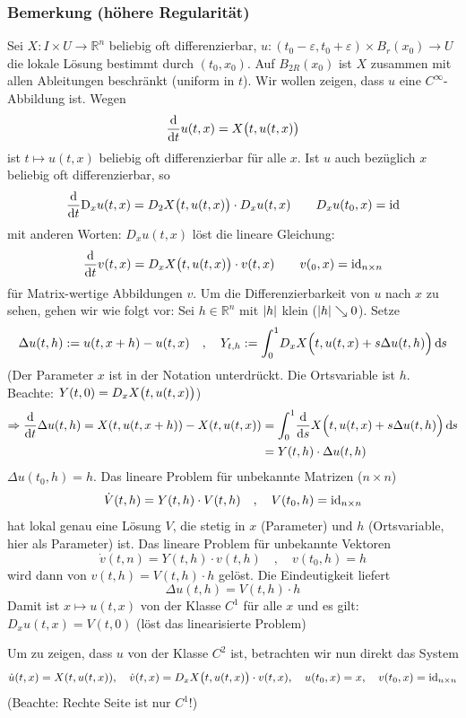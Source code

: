 \subsubsection{Bemerkung (höhere Regularität)} %
\label{ssub:233}
Sei $X : I  \times U \to \mathds{R}^n$ beliebig oft differenzierbar, $u : (t_0 - \varepsilon, t_0 + \varepsilon)  \times B_r(x_0) \to U$ die lokale Lösung bestimmt durch
$(t_0, x_0)$. Auf $B_{2R}(x_0)$ ist $X$ zusammen mit allen Ableitungen beschränkt (uniform in $t$). Wir wollen zeigen, dass $u$ eine $C^\infty$-Abbildung ist. Wegen 
\[
	\diffd{}{t} u(t,x) = X \enbrace[\big]{t, u(t,x)} 
\]
ist $t \mapsto u(t,x)$ beliebig oft differenzierbar für alle $x$. Ist $u$ auch bezüglich $x$ beliebig oft differenzierbar, so 
\[
	\diffd{}{t} \mathrm{D}_x u(t,x) = D_2 X \enbrace[\big]{t, u(t,x)}  \cdot D_x u(t,x) \qquad D_x u(t_0,x) = \id
\]
mit anderen Worten: $D_x u(t,x)$ löst die lineare Gleichung:
\[
	\diffd{}{t} v(t,x) = D_x X\enbrace[\big]{t, u(t,x) } \cdot v(t,x) \qquad v(_0, x) = \id_{n \times n}
\] 
für Matrix-wertige Abbildungen $v$. Um die Differenzierbarkeit von $u$ nach $x$ zu sehen, gehen wir wie folgt vor: Sei $h \in \mathds{R}^n$ mit $\abs*{h}$ klein
($\abs*{h} \searrow 0$). Setze
\[
	\Delta u(t,h) := u(t, x+h) - u(t,x) \quad , \quad Y_{t,h} := \int_0^1 \! D_x X\enbrace[\Big]{t, u(t,x) + s \Delta u(t,h)}  \, \mathd s
\]
(Der Parameter $x$ ist in der Notation unterdrückt. Die Ortsvariable ist $h$. Beachte: $Y(t,0) = D_x X \enbrace[\big]{t, u(t,x)} $)
\begin{align*}
	\Rightarrow  \diffd{}{t} \Delta u(t,h) = X (t,u(t,x+h)) - X(t, u(t,x)) &= \int_{0} ^{1} \! \diffd{}{s} X\enbrace[\Big]{t,u(t,x) + s \Delta u(t,h)}  \, \mathd s\\
	&= Y(t,h) \cdot \Delta u(t,h)
\end{align*}
$\Delta u(t_0,h) = h$. Das lineare Problem für unbekannte Matrizen ($n \times n$)
\[
	\dot V (t,h) = Y(t,h) \cdot V(t,h) \quad , \quad V(t_0,h) = \id_{n \times n}
\]
hat lokal genau eine Lösung $V$, die stetig in $x$ (Parameter) und $h$ (Ortsvariable, hier als Parameter) ist. Das lineare Problem für
unbekannte Vektoren 
\[
	\dot v(t,n) = Y(t,h) \cdot v(t,h) \quad , \quad v(t_0,h) = h
\]
wird dann von $v(t,h)= V(t,h) \cdot h$ gelöst. Die Eindeutigkeit liefert
\[
	\Delta u(t,h) = V(t,h) \cdot h
\]
Damit ist $x  \mapsto u(t,x)$ von der Klasse $C^1$ für alle $x$ und es gilt: 
\(
	D_x u(t,x) = V(t,0)
\) (löst das linearisierte Problem)

Um zu zeigen, dass $u$ von der Klasse $C^2$ ist, betrachten wir nun direkt das System 
\[
	\dot u(t,x) = X(t, u(t,x))  , \quad \dot v (t,x) = D_x X\enbrace[\big]{t, u(t,x)} \cdot v(t,x) , \quad u(t_0, x) = x , \quad v(t_0, x) = \id_{n \times n}
\]
(Beachte: Rechte Seite ist nur $C^1$!)

